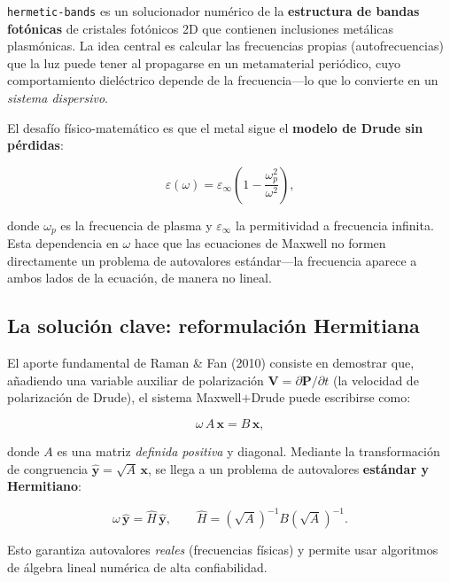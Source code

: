 \documentclass[12pt,a4paper]{article}
\begin{document}
\texttt{hermetic-bands} es un solucionador numérico de la \textbf{estructura de bandas fotónicas} de cristales fotónicos 2D que contienen inclusiones metálicas plasmónicas. La idea central es calcular las frecuencias propias (autofrecuencias) que la luz puede tener al propagarse en un metamaterial periódico, cuyo comportamiento dieléctrico depende de la frecuencia---lo que lo convierte en un \textit{sistema dispersivo}.

El desafío físico-matemático es que el metal sigue el \textbf{modelo de Drude sin pérdidas}:

\begin{equation}
    \varepsilon(\omega) = \varepsilon_\infty \left(1 - \frac{\omega_p^2}{\omega^2}\right),
    \label{eq:drude}
\end{equation}

donde $\omega_p$ es la frecuencia de plasma y $\varepsilon_\infty$ la permitividad a frecuencia infinita. Esta dependencia en $\omega$ hace que las ecuaciones de Maxwell no formen directamente un problema de autovalores estándar---la frecuencia aparece a ambos lados de la ecuación, de manera no lineal.

\subsection{La solución clave: reformulación Hermitiana}

El aporte fundamental de Raman \& Fan (2010) consiste en demostrar que, añadiendo una variable auxiliar de polarización $\mathbf{V} = \partial\mathbf{P}/\partial t$ (la velocidad de polarización de Drude), el sistema Maxwell$+$Drude puede escribirse como:

\begin{equation}
    \omega \, A\, \mathbf{x} = B\, \mathbf{x},
    \label{eq:generalized}
\end{equation}

donde $A$ es una matriz \textit{definida positiva} y diagonal. Mediante la transformación de congruencia $\hat{\mathbf{y}} = \sqrt{A}\,\mathbf{x}$, se llega a un problema de autovalores \textbf{estándar y Hermitiano}:

\begin{equation}
    \omega \,\hat{\mathbf{y}} = \hat{H}\, \hat{\mathbf{y}}, \qquad
    \hat{H} = \left(\sqrt{A}\right)^{-1} B \left(\sqrt{A}\right)^{-1}.
    \label{eq:hermitian}
\end{equation}

Esto garantiza autovalores \textit{reales} (frecuencias físicas) y permite usar algoritmos de álgebra lineal numérica de alta confiabilidad.
\end{document}
